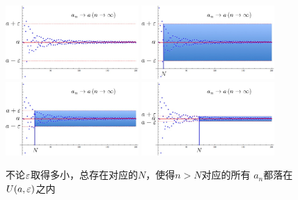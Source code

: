 \begin{figure}[h]
	\centering
	\includegraphics[width=0.45\textwidth]{./images/ch01/en1.jpg}\;
	\includegraphics[width=0.45\textwidth]{./images/ch01/en2.jpg}\\
	\includegraphics[width=0.45\textwidth]{./images/ch01/en3.jpg}\;
	\includegraphics[width=0.45\textwidth]{./images/ch01/en4.jpg}
	\caption{不论$\varepsilon$取得多小，总存在对应的$N$，使得$n>N$对应的所有
	$a_n$都落在$U(a,\varepsilon)$之内}
	\label{fig:e-N-def}
\end{figure}

